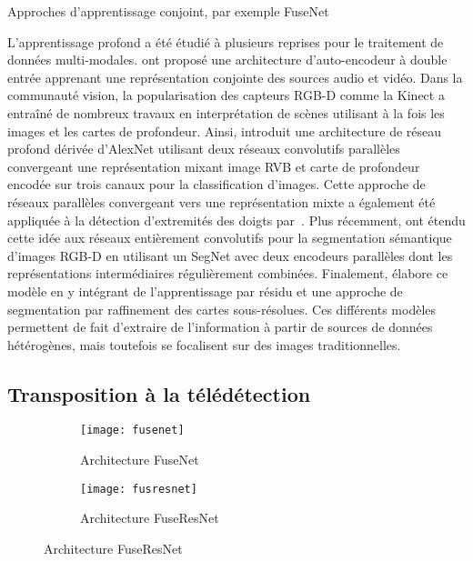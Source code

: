 Approches d'apprentissage conjoint, par exemple FuseNet

L'apprentissage profond a été étudié à plusieurs reprises pour le traitement de données multi-modales. \citet{ngiam_multimodal_2011} ont proposé une architecture d'auto-encodeur à double entrée apprenant une représentation conjointe des sources audio et vidéo. Dans la communauté vision, la popularisation des capteurs \gls{RGB-D} comme la Kinect a entraîné de nombreux travaux en interprétation de scènes utilisant à la fois les images et les cartes de profondeur. Ainsi, \citet{eitel_multimodal_2015} introduit une architecture de réseau profond dérivée d'AlexNet utilisant deux réseaux convolutifs parallèles convergeant une représentation mixant image \gls{RVB} et carte de profondeur encodée sur trois canaux pour la classification d'images. Cette approche de réseaux parallèles convergeant vers une représentation mixte a également été appliquée à la détection d'extremités des doigts par~\citet{guo_two-stream_2016}.
Plus récemment, \citet{hazirbas_fusenet_2016} ont étendu cette idée aux réseaux entièrement convolutifs pour la segmentation sémantique d'images \gls{RGB-D} en utilisant un SegNet avec deux encodeurs parallèles dont les représentations intermédiaires régulièrement combinées. Finalement, \cite{lee_rdfnet_2017} élabore ce modèle en y intégrant de l'apprentissage par résidu et une approche de segmentation par raffinement des cartes sous-résolues. Ces différents modèles permettent de fait d'extraire de l'information à partir de sources de données hétérogènes, mais toutefois se focalisent sur des images traditionnelles.

\subsection{Transposition à la télédétection}


\begin{figure}
  \begin{subfigure}{0.5\textwidth}
    \texttt{[image: fusenet]}
    \caption{Architecture FuseNet~\cite{hazirbas_fusenet_2016}}
    \label{fig:fusenet}
  \end{subfigure}%
  \begin{subfigure}{0.5\textwidth}
    \texttt{[image: fusresnet]}
    \caption{Architecture FuseResNet}
    \label{fig:fusresnet}
  \end{subfigure}
\end{figure}

